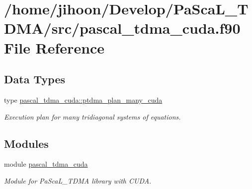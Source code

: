 \hypertarget{pascal__tdma__cuda_8f90}{}\section{/home/jihoon/\+Develop/\+Pa\+Sca\+L\+\_\+\+T\+D\+M\+A/src/pascal\+\_\+tdma\+\_\+cuda.f90 File Reference}
\label{pascal__tdma__cuda_8f90}
\subsection*{Data Types}
\begin{DoxyCompactItemize}
\item 
type \hyperlink{structpascal__tdma__cuda_1_1ptdma__plan__many__cuda}{pascal\+\_\+tdma\+\_\+cuda\+::ptdma\+\_\+plan\+\_\+many\+\_\+cuda}
\begin{DoxyCompactList}\small\item\em Execution plan for many tridiagonal systems of equations. \end{DoxyCompactList}\end{DoxyCompactItemize}
\subsection*{Modules}
\begin{DoxyCompactItemize}
\item 
module \hyperlink{namespacepascal__tdma__cuda}{pascal\+\_\+tdma\+\_\+cuda}
\begin{DoxyCompactList}\small\item\em Module for Pa\+Sca\+L\+\_\+\+T\+D\+MA library with C\+U\+DA. \end{DoxyCompactList}\end{DoxyCompactItemize}
